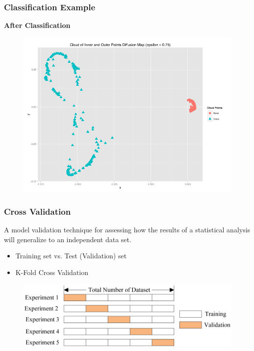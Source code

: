 \documentclass{beamer}
\begin{document}

\begin{frame}
\frametitle{Classification Example}
\textbf{After Classification}
\begin{figure}[h]
\begin{center}
\includegraphics[width=0.75\columnwidth]{post}
\end{center}
\end{figure}

\end{frame}



\begin{frame}
\frametitle{Cross Validation}

\begin{definition} 
A model validation technique for assessing how the results of a statistical analysis will generalize to an independent data set.
\end{definition}

\begin{itemize}
	\item Training set vs. Test (Validation) set
	\item K-Fold Cross Validation
\end{itemize}

\begin{figure}[h]
\begin{center}
\includegraphics[width=0.9\columnwidth]{kfold}
\end{center}
\end{figure}




\end{frame}
\end{document}
